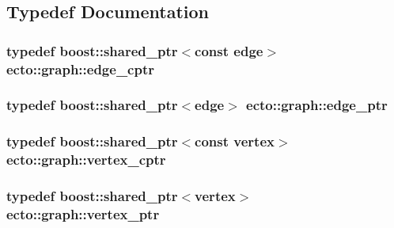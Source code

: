 \subsection{Typedef Documentation}
\hypertarget{namespaceecto_1_1graph_ac45fa43674f9071675a1ebbf4d021eb4}{
\subsubsection[{edge\-\_\-cptr}]{\setlength{\rightskip}{0pt plus 5cm}typedef boost\-::shared\-\_\-ptr$<$const {\bf edge}$>$ {\bf ecto\-::graph\-::edge\-\_\-cptr}}}\label{namespaceecto_1_1graph_ac45fa43674f9071675a1ebbf4d021eb4}
\hypertarget{namespaceecto_1_1graph_ad6da390ef18395607e6eab139f37fcf4}{
\subsubsection[{edge\-\_\-ptr}]{\setlength{\rightskip}{0pt plus 5cm}typedef boost\-::shared\-\_\-ptr$<${\bf edge}$>$ {\bf ecto\-::graph\-::edge\-\_\-ptr}}}\label{namespaceecto_1_1graph_ad6da390ef18395607e6eab139f37fcf4}
\hypertarget{namespaceecto_1_1graph_ab1ad7248e81caff384fed98d61fca8ca}{
\subsubsection[{vertex\-\_\-cptr}]{\setlength{\rightskip}{0pt plus 5cm}typedef boost\-::shared\-\_\-ptr$<$const {\bf vertex}$>$ {\bf ecto\-::graph\-::vertex\-\_\-cptr}}}\label{namespaceecto_1_1graph_ab1ad7248e81caff384fed98d61fca8ca}
\hypertarget{namespaceecto_1_1graph_a878e413dd7cdb7395b02f5be20e12b51}{
\subsubsection[{vertex\-\_\-ptr}]{\setlength{\rightskip}{0pt plus 5cm}typedef boost\-::shared\-\_\-ptr$<${\bf vertex}$>$ {\bf ecto\-::graph\-::vertex\-\_\-ptr}}}\label{namespaceecto_1_1graph_a878e413dd7cdb7395b02f5be20e12b51}


